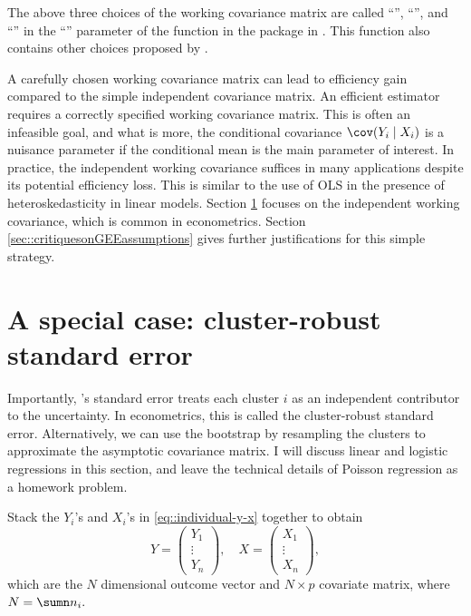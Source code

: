 The above three choices of the working covariance matrix are called
``'', ``'', and ``'' in the ``''
parameter of the function  in the  package in . This function
also contains other choices proposed by \citet{liang1986longitudinal}. 


A carefully chosen working covariance matrix can lead to efficiency gain compared to the simple independent covariance matrix. An efficient estimator requires a correctly specified working covariance matrix. This is often an infeasible goal, and what is more, the conditional covariance $\cov(Y_i\mid X_i)$ is a nuisance parameter if the conditional mean is the main parameter of interest. In practice, the independent working covariance suffices in many applications despite its potential efficiency loss. This is similar to the use of OLS in the presence of heteroskedasticity in linear models. Section \ref{sec::crse-econometrics} focuses on the independent working covariance, which is common in econometrics. Section \ref{sec::critiquesonGEEassumptions} gives further justifications for this simple strategy. 



\section{A special case: cluster-robust standard error} 
\label{sec::crse-econometrics}


Importantly, \citet{liang1986longitudinal}'s standard error treats each cluster $i$ as an independent contributor to the uncertainty. In econometrics, this is called the cluster-robust standard error. Alternatively, we can use the bootstrap by resampling the clusters to approximate the asymptotic covariance matrix.
I will discuss linear and logistic regressions in this section, and leave the technical details of Poisson regression as a homework problem. 




Stack the $Y_i$'s and $X_i$'s in \eqref{eq::individual-y-x} together to obtain 
$$
Y = \begin{pmatrix}
Y_1 \\
\vdots \\
Y_n
\end{pmatrix},\quad
X = \begin{pmatrix}
X_1 \\
\vdots \\
X_n
\end{pmatrix},
$$
which are the $N$ dimensional outcome vector and $N\times p$ covariate matrix, where $N = \sumn n_i.$


